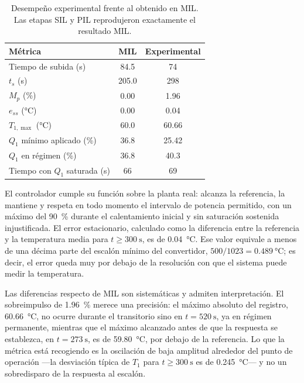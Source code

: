\begin{table}[!t]
\caption{Desempeño experimental frente al obtenido en MIL. Las etapas SIL y PIL reprodujeron
exactamente el resultado MIL.}
\label{tab:experimental}
\centering
\footnotesize
\begin{tabular}{@{}lS[table-format=3.1]S[table-format=3.2]@{}}
\toprule
\textbf{Métrica} & {\textbf{MIL}} & {\textbf{Experimental}} \\
\midrule
Tiempo de subida (\si{\second})           & 84.5  & 74 \\
$t_s$ (\si{\second})                      & 205.0 & 298 \\
$M_p$ (\si{\percent})                     & 0.00  & 1.96 \\
$e_{ss}$ (\si{\celsius})                  & 0.00  & 0.04 \\
$T_{1,\max}$ (\si{\celsius})              & 60.0  & 60.66 \\
$Q_1$ mínimo aplicado (\si{\percent})     & 36.8  & 25.42 \\
$Q_1$ en régimen (\si{\percent})          & 36.8  & 40.3 \\
Tiempo con $Q_1$ saturada (\si{\second})  & 66    & 69 \\
\bottomrule
\end{tabular}
\end{table}

El controlador cumple su función sobre la planta real: alcanza la referencia, la mantiene y respeta
en todo momento el intervalo de potencia permitido, con un máximo del \SI{90}{\percent} durante el
calentamiento inicial y sin saturación sostenida injustificada. El error estacionario, calculado como la diferencia entre la
referencia y la temperatura media para $t \geq \SI{300}{\second}$, es de \SI{0.04}{\celsius}.
Ese valor equivale a menos de una décima parte del escalón mínimo del convertidor,
$500/1023 = \SI{0.489}{\celsius}$; es decir, el error queda muy por debajo de la resolución con que
el sistema puede medir la temperatura.

Las diferencias respecto de MIL son sistemáticas y admiten interpretación. El sobreimpulso de
\SI{1.96}{\percent} merece una precisión: el máximo absoluto del registro,
\SI{60.66}{\celsius}, no ocurre durante el transitorio sino en $t = \SI{520}{\second}$, ya en
régimen permanente, mientras que el máximo alcanzado antes de que la respuesta se
establezca, en $t = \SI{273}{\second}$, es de \SI{59.80}{\celsius}, por debajo de la referencia. Lo que la métrica está recogiendo es la
oscilación de baja amplitud alrededor del punto de operación ---la desviación típica de $T_1$ para
$t \geq \SI{300}{\second}$ es de \SI{0.245}{\celsius}--- y no un sobredisparo de la respuesta al
escalón.

